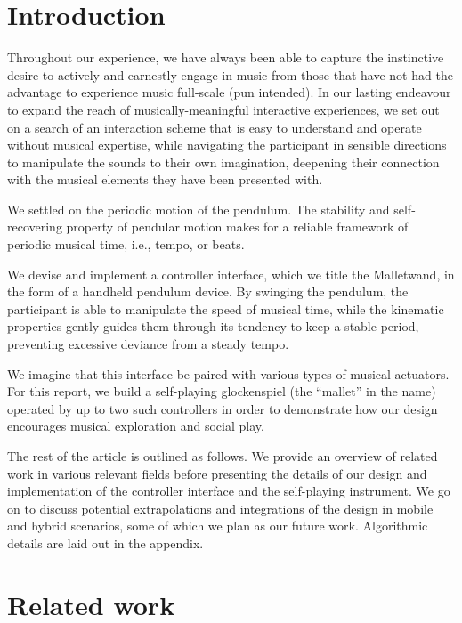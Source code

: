 \documentclass{nime-alternate} %
\begin{document}
\printccsdesc


\section{Introduction}

Throughout our experience, we have always been able to capture the instinctive desire to actively and earnestly engage in music from those that have not had the advantage to experience music full-scale (pun intended).
In our lasting endeavour to expand the reach of musically-meaningful interactive experiences, we set out on a search of an interaction scheme that is easy to understand and operate without musical expertise, while navigating the participant in sensible directions to manipulate the sounds to their own imagination, deepening their connection with the musical elements they have been presented with.

We settled on the periodic motion of the pendulum. The stability and self-recovering property of pendular motion makes for a reliable framework of periodic musical time, i.e., tempo, or beats.

We devise and implement a controller interface, which we title the Malletwand, in the form of a handheld pendulum device. By swinging the pendulum, the participant is able to manipulate the speed of musical time, while the kinematic properties gently guides them through its tendency to keep a stable period, preventing excessive deviance from a steady tempo.

We imagine that this interface be paired with various types of musical actuators. For this report, we build a self-playing glockenspiel (the ``mallet'' in the name) operated by up to two such controllers in order to demonstrate how our design encourages musical exploration and social play.

The rest of the article is outlined as follows. We provide an overview of related work in various relevant fields before presenting the details of our design and implementation of the controller interface and the self-playing instrument. We go on to discuss potential extrapolations and integrations of the design in mobile and hybrid scenarios, some of which we plan as our future work. Algorithmic details are laid out in the appendix.

\section{Related work}
\end{document}
